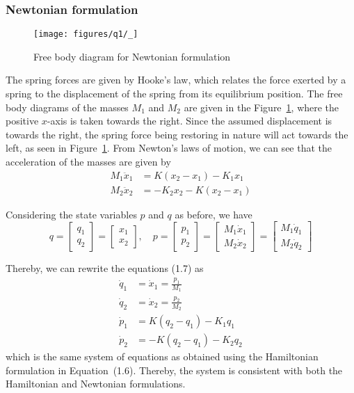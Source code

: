 \clearpage
\subsubsection*{Newtonian formulation}

\begin{figure}[htb]
    \centering
    \texttt{[image: figures/q1/\_]}
    \caption{
        Free body diagram for Newtonian formulation
    }\label{fig:q1-newtonian}
\end{figure}

The spring forces are given by Hooke's law, which relates the force exerted by a spring to the displacement of the spring from its equilibrium position.
The free body diagrams of the masses \(M_1\) and \(M_2\) are given in the Figure~\ref{fig:q1-newtonian}, where the positive \(x\)-axis is taken towards the right.
Since the assumed displacement is towards the right, the spring force being restoring in nature will act towards the left, as seen in Figure~\ref{fig:q1-newtonian}.
From Newton's laws of motion, we can see that the acceleration of the masses are given by
\[
    \begin{aligned}
        M_1 \ddot x_1 & = K (x_2 - x_1) - K_1 x_1  \\
        M_2 \ddot x_2 & = -K_2 x_2 - K (x_2 - x_1)
    \end{aligned}
    \tag{1.7}
\]

Considering the state variables \(p\) and \(q\) as before, we have
\[
    q = \begin{bmatrix} q_1 \\ q_2 \end{bmatrix} = \begin{bmatrix} x_1 \\ x_2 \end{bmatrix},
    \quad
    p = \begin{bmatrix} p_1 \\ p_2 \end{bmatrix} = \begin{bmatrix} M_1 \dot x_1 \\ M_2 \dot x_2 \end{bmatrix} = \begin{bmatrix} M_1 \dot q_1 \\ M_2 \dot q_2 \end{bmatrix}
\]

Thereby, we can rewrite the equations (1.7) as
\[
    \begin{aligned}
        \dot q_1 & = \dot x_1 = \frac{p_1}{M_1} \\
        \dot q_2 & = \dot x_2 = \frac{p_2}{M_2} \\
        \dot p_1 & = K (q_2 - q_1) - K_1 q_1    \\
        \dot p_2 & = -K (q_2 - q_1) - K_2 q_2
    \end{aligned}
\]
which is the same system of equations as obtained using the Hamiltonian formulation in Equation~(1.6).
Thereby, the system is consistent with both the Hamiltonian and Newtonian formulations.
